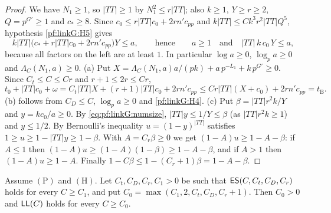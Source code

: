 \begin{proof}
We have $N_1\ge1$, so $|TT|\ge1$ by $N_1^2\le r|TT|$; also $k\ge1$, $Y\ge r\ge2$, $Q=p^{G'}\ge1$ and $c_*\ge8$. Since
$c_0\le r|TT|c_0+2rn'c_{pp}$ and $k|TT|\le Ck^3r^2|TT|Q^5$, hypothesis \ref{pf:linkG:H5} gives
\begin{equation}\label{eq:pf:linkG:numsize}
k|TT|\bigl(c_*+r|TT|c_0+2rn'c_{pp}\bigr)Y\le a,\qquad\text{hence}\qquad a\ge1\quad\text{and}\quad |TT|\,k\,c_0\,Y\le a,
\end{equation}
because all factors on the left are at least $1$. In particular $\log a\ge0$, $\log_pa\ge0$ and $\Lambda_C(N_1,a)\ge0$.
(a) Put $X=\Lambda_C(N_1,a)a/(pk)+a\,p^{-L_1}+k\,p^{G'}\ge0$. Since $C_t\le C\le Cr$ and $r+1\le2r\le Cr$,
\[
t_0+|TT|c_0+\omega=C_t|TT|X+(r+1)|TT|c_0+2rn'c_{pp}\le Cr|TT|(X+c_0)+2rn'c_{pp}=t_{\mathrm B}.
\]
(b) follows from $C_D\le C$, $\log_pa\ge0$ and \ref{pf:linkG:H4}. (c) Put $\beta=|TT|r^2k/Y$ and $y=kc_0/a\ge0$. By
\eqref{eq:pf:linkG:numsize}, $|TT|y\le1/Y\le\beta$ (as $|TT|r^2k\ge1$) and $y\le1/2$. By Bernoulli's inequality
$u=(1-y)^{|TT|}$ satisfies $1\ge u\ge1-|TT|y\ge1-\beta$. With $A=C_r\beta\ge0$ we get $(1-A)u\ge1-A-\beta$: if $A\le1$
then $(1-A)u\ge(1-A)(1-\beta)\ge1-A-\beta$, and if $A>1$ then $(1-A)u\ge1-A$. Finally $1-C\beta\le1-(C_r+1)\beta=1-A-\beta$.
\end{proof}

\begin{proposition}\label{pf:linkG:edgeassembly}
Assume $(\mathrm P)$ and $(\mathrm H)$. Let $C_t,C_D,C_r,C_1>0$ be such that
$\mathsf{ES}(C,C_t,C_D,C_r)$ holds for every $C\ge C_1$, and put $C_0=\max(C_1,2,C_t,C_D,C_r+1)$. Then $C_0>0$ and
$\mathsf{LL}(C)$ holds for every $C\ge C_0$.
\end{proposition}


